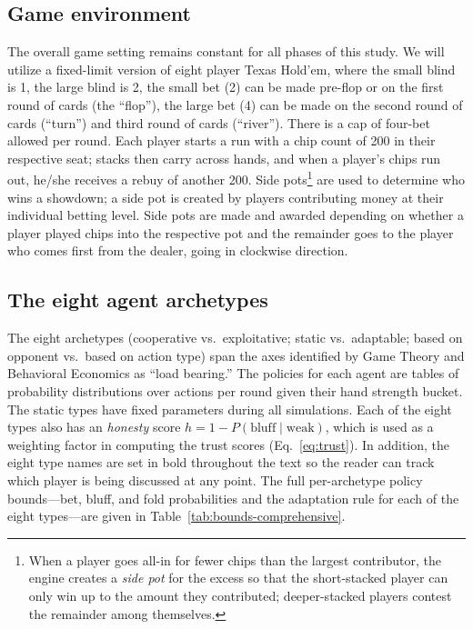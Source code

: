 \documentclass[10pt]{article} %
\begin{document}
\subsection{Game environment}
The overall game setting remains constant for all phases of this
study. We will utilize a fixed-limit version of eight player Texas
Hold'em, where the small blind is 1, the large blind is 2, the small
bet (2) can be made pre-flop or on the first round of cards (the
``flop''), the large bet (4) can be made on the
second round of cards (``turn'') and third round of cards
(``river''). There is a cap of four-bet allowed per round. Each player starts a run with a chip count of 200 in their
respective seat; stacks then carry across hands, and when a player's
chips run out, he/she receives a rebuy of another 200. Side
pots\footnote{When a player goes all-in for fewer chips than the
largest contributor, the engine creates a \textit{side pot} for the
excess so that the short-stacked player can only win up to the
amount they contributed; deeper-stacked players contest the
remainder among themselves.} are used to determine who wins a
showdown; a side pot is created by
players contributing money at their individual betting level. Side
pots are made and awarded depending on whether a player played chips
into the respective pot and the remainder goes to the player who
comes first from the dealer, going in clockwise direction.

\subsection{The eight agent archetypes}\label{sec:archetypes}
The eight archetypes (cooperative vs.\ exploitative; static vs.\
adaptable; based on opponent vs.\ based on action type) span the
axes identified by Game Theory and Behavioral Economics as ``load
bearing.'' The policies for each agent are tables of probability
distributions over actions per round given their hand strength
bucket. The static types have fixed parameters during all
simulations. Each of the eight types also has an \textit{honesty}
score $h = 1 - P(\text{bluff}\mid\text{weak})$,
which is used as a weighting factor in computing the trust scores
(Eq.~\ref{eq:trust}). In addition, the eight type names are set in
bold throughout the text so the reader can track which player is
being discussed at any point. The full per-archetype policy
bounds---bet, bluff, and fold
probabilities and the adaptation rule for each of the eight
types---are given in Table~\ref{tab:bounds-comprehensive}.
\end{document}
